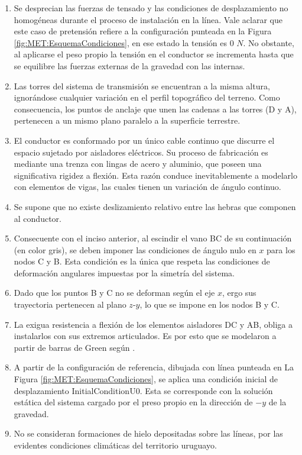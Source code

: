 \begin{enumerate}
	\item  Se desprecian las fuerzas de tensado y las condiciones de desplazamiento no homogéneas durante el proceso de instalación en la línea. Vale aclarar que este caso de pretensión refiere a la configuración punteada en la Figura \ref{fig:MET:EsquemaCondiciones}, en ese estado la tensión es 0 $N$. No obstante, al aplicarse el peso propio la tensión en el conductor se incrementa hasta que se equilibre las fuerzas externas de la gravedad con las internas. 
	\item Las torres del sistema de transmisión se encuentran a la misma altura, ignorándose cualquier variación en el perfil topográfico del terreno. Como consecuencia, los puntos de anclaje que unen las cadenas a las torres (D y A), pertenecen a un mismo plano paralelo a la superficie terrestre.
	\item  El conductor es conformado por un único cable continuo que discurre el espacio sujetado por aisladores eléctricos. Su proceso de fabricación es mediante una trenza con lingas de acero y aluminio, que poseen una significativa rigidez a flexión. Esta razón conduce inevitablemente a modelarlo con elementos de vigas, las cuales tienen un variación de ángulo continuo.
	\item Se supone que no existe deslizamiento relativo entre las hebras que componen al conductor.  
	\item Consecuente con el inciso anterior, al escindir el vano BC de su continuación (en color gris), se deben imponer las condiciones de ángulo nulo en $x$ para los nodos C y B. Esta condición es la única que respeta las condiciones de deformación angulares impuestas por la simetría del sistema.
	\item Dado que los puntos B y C no se deforman según el eje $x$, ergo sus trayectoria pertenecen al plano $z$-$y$, lo que se impone en los nodos B y C. 
	\item La exigua resistencia a flexión de los elementos aisladores DC y AB, obliga a instalarlos con sus extremos articulados. Es por esto que se modelaron a partir de barras de Green según \cite{Crisfield}. 
	\item A partir de la configuración de referencia, dibujada con línea punteada en La Figura \ref{fig:MET:EsquemaCondiciones}, se aplica una condición inicial de desplazamiento \gls{InitialConditionU0}. Esta se corresponde con la solución estática del sistema cargado por el preso propio en la dirección de $-y$ de la gravedad.
	\item No se consideran formaciones de hielo depositadas sobre las líneas, por las evidentes condiciones climáticas del territorio uruguayo.
\end{enumerate} 

